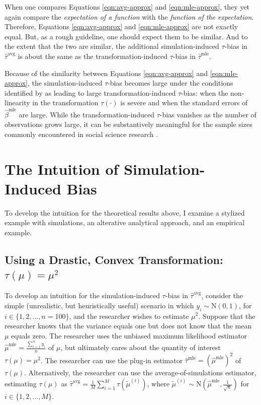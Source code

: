 \documentclass[12pt]{article}
\begin{document}
When one compares Equations \ref{eqn:avg-approx} and \ref{eqn:mle-approx}, they yet again compare the \textit{expectation of a function} with the \textit{function of the expectation}.
Therefore, Equations \ref{eqn:avg-approx} and \ref{eqn:mle-approx} are not exactly equal.
But, as a rough guideline, one should expect them to be similar.
And to the extent that the two are similar, the additional simulation-induced $\tau$-bias in $\hat{\tau}^\text{avg}$ is about the same as the transformation-induced $\tau$-bias in $\hat{\tau}^\text{mle}$. 

Because of the similarity between Equations \ref{eqn:avg-approx} and \ref{eqn:mle-approx}, the simulation-induced $\tau$-bias becomes large under the conditions identified by \cite{Rainey2017} as leading to large transformation-induced $\tau$-bias: when the non-linearity in the transformation $\tau(\cdot)$ is severe and when the standard errors of $\hat{\beta}^\text{mle}$ are large.
While the transformation-induced $\tau$-bias vanishes as the number of observations grows large, it can be substantively meaningful for the sample sizes commonly encountered in social science research \citep{Rainey2017}.

\section*{The Intuition of Simulation-Induced Bias}

To develop the intuition for the theoretical results above, I examine a stylized example with simulations, an alterative analytical approach, and an empirical example.

\subsection*{Using a Drastic, Convex Transformation: $\tau(\mu) = \mu^2$}

To develop an intuition for the simulation-induced $\tau$-bias in $\hat{\tau}^\text{avg}$, consider the simple (unrealistic, but heuristically useful) scenario in which $y_i \sim \text{N}(0, 1)$, for $i \in \{1, 2, \ldots, n = 100\}$, and the researcher wishes to estimate $\mu^2$. Suppose that the researcher knows that the variance equals one but does not know that the mean $\mu$ equals zero. The researcher uses the unbiased maximum likelihood estimator $\hat{\mu}^\text{mle} = \frac{\sum_{i=1}^n y_i}{n}$ of $\mu$, but ultimately cares about the quantity of interest $\tau(\mu) = \mu^2$. The researcher can use the plug-in estimator $\hat{\tau}^\text{mle} = \left( \hat{\mu}^\text{mle} \right) ^2$ of $\tau(\mu)$. Alternatively, the researcher can use the average-of-simulations estimator, estimating $\tau(\mu)$ as $\hat{\tau}^\text{avg} = \frac{1}{M} \sum_{i = 1}^M \tau \left( \tilde{\mu}^{(i)} \right)$, where $\tilde{\mu}^{(i)} \sim \text{N} \left( \hat{\mu}^\text{mle}, \frac{1}{\sqrt{n}} \right)$ for $i \in \{1, 2,\ldots, M\}$.
\end{document}
